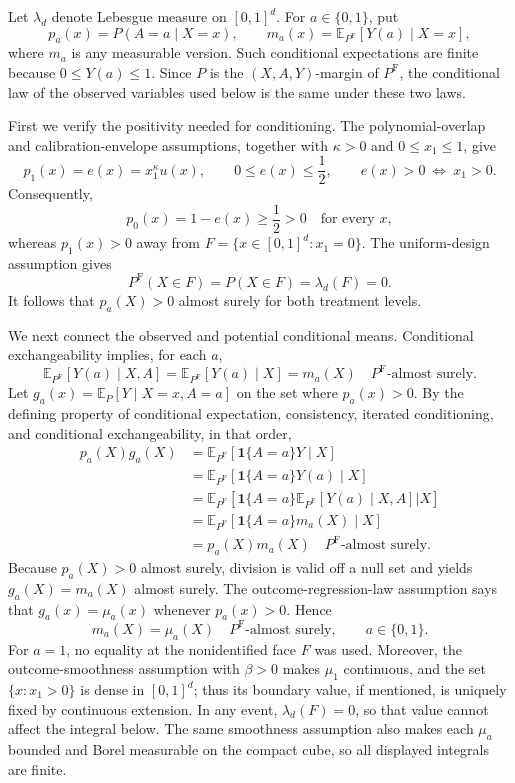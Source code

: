 Let \(\lambda_d\) denote Lebesgue measure on \([0,1]^d\).  For
\(a\in\{0,1\}\), put
\[
p_a(x)=P(A=a\mid X=x),
\qquad
m_a(x)=\mathbb E_{P^{\mathrm F}}[Y(a)\mid X=x],
\]
where \(m_a\) is any measurable version.  Such conditional expectations are
finite because \(0\leq Y(a)\leq1\).  Since \(P\) is the
\((X,A,Y)\)-margin of \(P^{\mathrm F}\), the conditional law of the observed
variables used below is the same under these two laws.

First we verify the positivity needed for conditioning.  The polynomial-overlap
and calibration-envelope assumptions, together with \(\kappa>0\) and
\(0\leq x_1\leq1\), give
\[
p_1(x)=e(x)=x_1^\kappa u(x),
\qquad
0\leq e(x)\leq\frac12,
\qquad
e(x)>0\ \Longleftrightarrow\ x_1>0.
\]
Consequently,
\[
p_0(x)=1-e(x)\geq\frac12>0
\quad\text{for every }x,
\]
whereas \(p_1(x)>0\) away from
\(F=\{x\in[0,1]^d:x_1=0\}\).  The uniform-design assumption gives
\[
P^{\mathrm F}(X\in F)=P(X\in F)=\lambda_d(F)=0.
\]
It follows that \(p_a(X)>0\) almost surely for both treatment levels.

We next connect the observed and potential conditional means.  Conditional
exchangeability implies, for each \(a\),
\[
\mathbb E_{P^{\mathrm F}}[Y(a)\mid X,A]
=\mathbb E_{P^{\mathrm F}}[Y(a)\mid X]
=m_a(X)
\quad P^{\mathrm F}\text{-almost surely}.
\]
Let \(g_a(x)=\mathbb E_P[Y\mid X=x,A=a]\) on the set where
\(p_a(x)>0\).  By the defining property of conditional expectation,
consistency, iterated conditioning, and conditional exchangeability, in that
order,
\[
\begin{aligned}
p_a(X)g_a(X)
&=\mathbb E_{P^{\mathrm F}}[\mathbf 1\{A=a\}Y\mid X]\\
&=\mathbb E_{P^{\mathrm F}}[\mathbf 1\{A=a\}Y(a)\mid X]\\
&=\mathbb E_{P^{\mathrm F}}\!\left[
  \mathbf 1\{A=a\}
  \mathbb E_{P^{\mathrm F}}[Y(a)\mid X,A]
  \mathrel{\big|}X\right]\\
&=\mathbb E_{P^{\mathrm F}}[\mathbf 1\{A=a\}m_a(X)\mid X]\\
&=p_a(X)m_a(X)
\quad P^{\mathrm F}\text{-almost surely}.
\end{aligned}
\]
Because \(p_a(X)>0\) almost surely, division is valid off a null set and yields
\(g_a(X)=m_a(X)\) almost surely.  The outcome-regression-law assumption says
that \(g_a(x)=\mu_a(x)\) whenever \(p_a(x)>0\).  Hence
\[
m_a(X)=\mu_a(X)
\quad P^{\mathrm F}\text{-almost surely},
\qquad a\in\{0,1\}.
\]
For \(a=1\), no equality at the nonidentified face \(F\) was used.  Moreover,
the outcome-smoothness assumption with \(\beta>0\) makes \(\mu_1\) continuous,
and the set \(\{x:x_1>0\}\) is dense in \([0,1]^d\); thus its boundary value,
if mentioned, is uniquely fixed by continuous extension.  In any event,
\(\lambda_d(F)=0\), so that value cannot affect the integral below.  The same
smoothness assumption also makes each \(\mu_a\) bounded and Borel measurable on
the compact cube, so all displayed integrals are finite.

